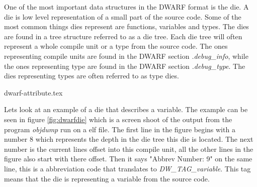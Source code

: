  


One of the most important data structures in the \gls{DWARF} format is the \gls{die}.
A \gls{die} is low level representation of a small part of the source code.
Some of the most common things \glspl{die} represent are functions, variables and types.
The \glspl{die} are found in a tree structure referred to as a \gls{die} tree.
Each \gls{die} tree will often represent a whole compile unit or a type from the source code.
The ones representing compile units are found in the \gls{DWARF} section \emph{.debug\_info}, while the ones representing type are found in the \gls{DWARF} section \emph{.debug\_type}.
The \glspl{die} representing types are often referred to as type \glspl{die}.




{dwarf-attribute.tex}


Lets look at an example of a \gls{die} that describes a variable.
The example can be seen in figure \ref{fig:dwarfdie} which is a screen shoot of the output from the program \emph{objdump} run on a \gls{elf} file.
The first line in the figure begins with a number $8$ which represents the depth in the \gls{die} tree this \gls{die} is located.
The next number is the current lines offset into this compile unit, all the other lines in the figure also start with there offset.
Then it says "Abbrev Number: 9" on the same line, this is a  abbreviation code that translates to \emph{DW\_TAG\_variable}.
This tag means that the \gls{die} is representing a variable from the source code.



